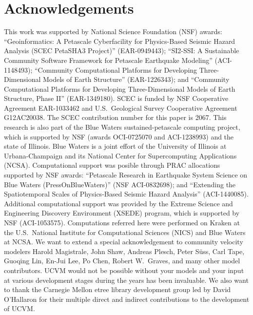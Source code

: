 
\section{Acknowledgements}

This work was supported by National Science Foundation (NSF) awards: ``Geoinformatics: A Petascale Cyberfacility for Physics-Based Seismic Hazard Analysis (SCEC PetaSHA3 Project)'' (EAR-0949443); ``SI2-SSI: A Sustainable Community Software Framework for Petascale Earthquake Modeling'' (ACI-1148493); ``Community Computational Platforms for Developing Three-Dimensional Models of Earth Structure'' (EAR-1226343); and ``Community Computational Platforms for Developing Three-Dimensional Models of Earth Structure, Phase II'' (EAR-1349180). SCEC is funded by NSF Cooperative Agreement EAR-1033462 and U.S.~Geological Survey Cooperative Agreement G12AC20038. The SCEC contribution number for this paper is 2067. This research is also part of the Blue Waters sustained-petascale computing project, which is supported by NSF (awards OCI-0725070 and ACI-1238993) and the state of Illinois. Blue Waters is a joint effort of the University of Illinois at Urbana-Champaign and its National Center for Supercomputing Applications (NCSA). Computational support was posible through PRAC allocations supported by NSF awards: ``Petascale Research in Earthquake System Science on Blue Waters (PressOnBlueWaters)'' (NSF ACI-0832698); and ``Extending the Spatiotemporal Scales of Physics-Based Seismic Hazard Analysis'' (ACI-1440085). Additional computational support was provided by the Extreme Science and Engineering Discovery Environment (XSEDE) program, which is supported by NSF (ACI-1053575). Computations referred here were performed on Kraken at the U.S.~National Institute for Computational Sciences (NICS) and Blue Waters at NCSA. We want to extend a special acknowledgement to community velocity modelers Harold Magistrale, John Shaw, Andreas Plesch, Peter S\"{u}ss, Carl Tape, Guoqing Lin, En-Jui Lee, Po Chen, Robert W.~Graves, and many other model contributors. UCVM would not be possible without your models and your input at various development stages during the years has been invaluable. We also want to thank the Carnegie Mellon etree library development group led by David O'Hallaron for their multiple direct and indirect contributions to the development of UCVM.
